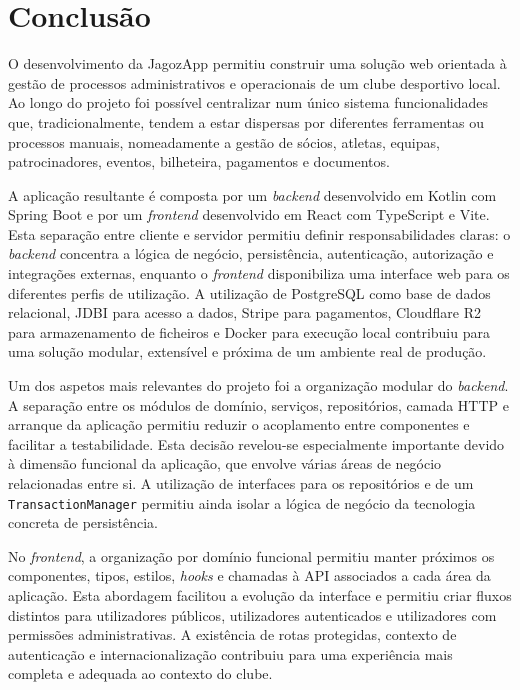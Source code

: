 \chapter{Conclusão}
\label{cap:end}

O desenvolvimento da JagozApp permitiu construir uma solução web orientada à gestão de processos administrativos e operacionais de um clube desportivo local. Ao longo do projeto foi possível centralizar num único sistema funcionalidades que, tradicionalmente, tendem a estar dispersas por diferentes ferramentas ou processos manuais, nomeadamente a gestão de sócios, atletas, equipas, patrocinadores, eventos, bilheteira, pagamentos e documentos.

A aplicação resultante é composta por um \textit{backend} desenvolvido em Kotlin com Spring Boot e por um \textit{frontend} desenvolvido em React com TypeScript e Vite. Esta separação entre cliente e servidor permitiu definir responsabilidades claras: o \textit{backend} concentra a lógica de negócio, persistência, autenticação, autorização e integrações externas, enquanto o \textit{frontend} disponibiliza uma interface web para os diferentes perfis de utilização. A utilização de PostgreSQL como base de dados relacional, JDBI para acesso a dados, Stripe para pagamentos, Cloudflare R2 para armazenamento de ficheiros e Docker para execução local contribuiu para uma solução modular, extensível e próxima de um ambiente real de produção.

Um dos aspetos mais relevantes do projeto foi a organização modular do \textit{backend}. A separação entre os módulos de domínio, serviços, repositórios, camada HTTP e arranque da aplicação permitiu reduzir o acoplamento entre componentes e facilitar a testabilidade. Esta decisão revelou-se especialmente importante devido à dimensão funcional da aplicação, que envolve várias áreas de negócio relacionadas entre si. A utilização de interfaces para os repositórios e de um \texttt{TransactionManager} permitiu ainda isolar a lógica de negócio da tecnologia concreta de persistência.

No \textit{frontend}, a organização por domínio funcional permitiu manter próximos os componentes, tipos, estilos, \textit{hooks} e chamadas à API associados a cada área da aplicação. Esta abordagem facilitou a evolução da interface e permitiu criar fluxos distintos para utilizadores públicos, utilizadores autenticados e utilizadores com permissões administrativas. A existência de rotas protegidas, contexto de autenticação e internacionalização contribuiu para uma experiência mais completa e adequada ao contexto do clube.

